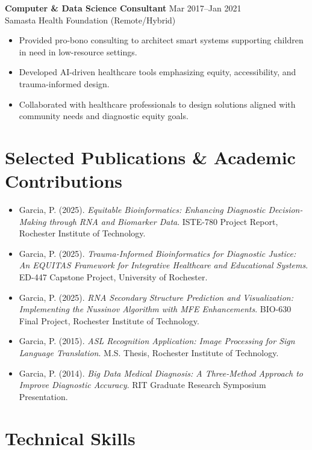 \documentclass[11pt,letterpaper]{article}
\begin{document}
\textbf{Computer \& Data Science Consultant} \hfill Mar 2017–Jan 2021\\
Samasta Health Foundation (Remote/Hybrid)
\begin{itemize}
    \item Provided pro-bono consulting to architect smart systems supporting children in need in low-resource settings.
    \item Developed AI-driven healthcare tools emphasizing equity, accessibility, and trauma-informed design.
    \item Collaborated with healthcare professionals to design solutions aligned with community needs and diagnostic equity goals.
\end{itemize}

\section{Selected Publications \& Academic Contributions}

\begin{itemize}
    \item Garcia, P. (2025). \textit{Equitable Bioinformatics: Enhancing Diagnostic Decision-Making through RNA and Biomarker Data}. ISTE-780 Project Report, Rochester Institute of Technology.
    \item Garcia, P. (2025). \textit{Trauma-Informed Bioinformatics for Diagnostic Justice: An EQUITAS Framework for Integrative Healthcare and Educational Systems}. ED-447 Capstone Project, University of Rochester.
    \item Garcia, P. (2025). \textit{RNA Secondary Structure Prediction and Visualization: Implementing the Nussinov Algorithm with MFE Enhancements}. BIO-630 Final Project, Rochester Institute of Technology.
    \item Garcia, P. (2015). \textit{ASL Recognition Application: Image Processing for Sign Language Translation}. M.S. Thesis, Rochester Institute of Technology.
    \item Garcia, P. (2014). \textit{Big Data Medical Diagnosis: A Three-Method Approach to Improve Diagnostic Accuracy}. RIT Graduate Research Symposium Presentation.
\end{itemize}

\section{Technical Skills}
\end{document}
